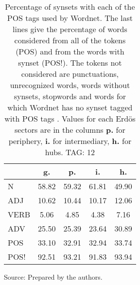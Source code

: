 \begin{table}[h!]
\begin{center}
	\caption{Percentage of synsets with each of the POS tags used by Wordnet. The last lines give the percentage of words considered from all of the tokens (POS) and from the words with synset (POS!). The tokens not considered are punctuations, unrecognized words, words without synsets, stopwords and words for which Wordnet has no synset  tagged with POS tags . Values for each Erd\"os sectors are in the columns {{\bf p.}} for periphery, {{\bf i.}} for intermediary, {{\bf h.}} for hubs. TAG: 12}\label{tab:wnpos}
\begin{tabular}{| l || c | c | c | c |}\hline
 & {\bf g.} & {\bf p.} & {\bf i.} & {\bf h.} \\\hline\hline
N & 58.82  & 59.32  & 61.81  & 49.90 \\\hline
ADJ & 10.62  & 10.44  & 10.17  & 12.06 \\\hline
VERB & 5.06  & 4.85  & 4.38  & 7.16 \\\hline
ADV & 25.50  & 25.39  & 23.64  & 30.89 \\\hline\hline
POS & 33.10  & 32.91  & 32.94  & 33.74 \\\hline
POS! & 92.51  & 93.21  & 91.83  & 93.94 \\\hline
\end{tabular}
\begin{flushleft}
		Source: Prepared by the authors.\
\end{flushleft}
\end{center}
\end{table}
